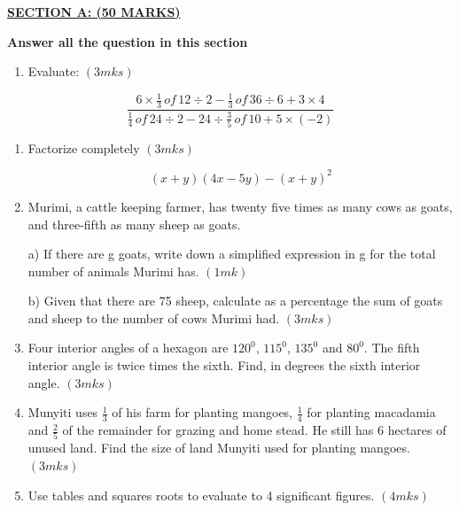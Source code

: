 \documentclass[
  a4paperpaper,
]{scrbook}
\providecommand{\tightlist}{%
  \setlength{\itemsep}{0pt}\setlength{\parskip}{0pt}}\usepackage{longtable,booktabs,array}
\begin{document}
\begin{tcolorbox}[enhanced jigsaw, left=2mm, colframe=quarto-callout-note-color-frame, toptitle=1mm, opacitybacktitle=0.6, rightrule=.15mm, colbacktitle=quarto-callout-note-color!10!white, colback=white, arc=.35mm, breakable, leftrule=.75mm, bottomtitle=1mm, bottomrule=.15mm, title=\textcolor{quarto-callout-note-color}{\faInfo}\hspace{0.5em}{Model Sample Paper 8}, titlerule=0mm, coltitle=black, toprule=.15mm, opacityback=0]

\ul{\textbf{SECTION A: (50 MARKS)}}

\textbf{Answer all the question in this section}

\begin{enumerate}
\def\labelenumi{\arabic{enumi}.}
\tightlist
\item
  Evaluate: \((3mks)\)
\end{enumerate}

\[ \frac{6\times\frac{1}{3}\,of\,12\div2-\frac{1}{3}\,of\,36\div6+3\times4}{\frac{1}{4}\,of\,24\div2-24\div\frac{3}{5}\,of\,10+5\times(-2)}\]

\begin{enumerate}
\def\labelenumi{\arabic{enumi}.}
\setcounter{enumi}{1}
\item
  Factorize completely \((3mks)\)

  \[(x+y)(4x-5y)-(x+y)^2\]
\item
  Murimi, a cattle keeping farmer, has twenty five times as many cows as
  goats, and three-fifth as many sheep as goats.

  a) If there are g goats, write down a simplified expression in g for
  the total number of animals Murimi has. \((1mk)\)

  b) Given that there are 75 sheep, calculate as a percentage the sum of
  goats and sheep to the number of cows Murimi had. \((3mks)\)
\item
  Four interior angles of a hexagon are \(120^0\), \(115^0\), \(135^0\)
  and \(80^0\). The fifth interior angle is twice times the sixth. Find,
  in degrees the sixth interior angle. \((3mks)\)
\item
  Munyiti uses \(\frac{1}{3}\) of his farm for planting mangoes,
  \(\frac{1}{4}\) for planting macadamia and \(\frac{2}{5}\) of the
  remainder for grazing and home stead. He still has 6 hectares of
  unused land. Find the size of land Munyiti used for planting
  mangoes.\((3mks)\)
\item
  Use tables and squares roots to evaluate to 4 significant figures.
  \((4mks)\)
\end{enumerate}


\end{tcolorbox}
\end{document}

